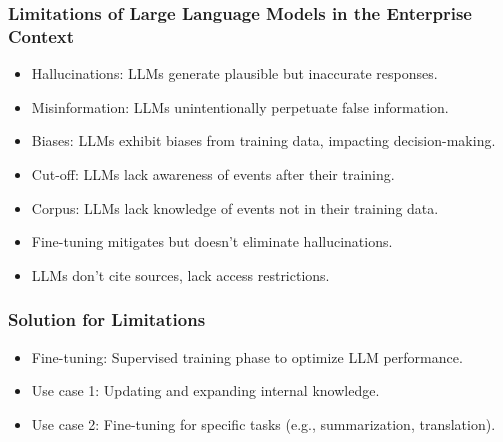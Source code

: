 


\begin{frame}[fragile]\frametitle{Limitations of Large Language Models in the Enterprise Context}

\begin{itemize}
\item Hallucinations: LLMs generate plausible but inaccurate responses.
\item Misinformation: LLMs unintentionally perpetuate false information.
\item Biases: LLMs exhibit biases from training data, impacting decision-making.
\item Cut-off: LLMs lack awareness of events after their training.
\item Corpus: LLMs lack knowledge of events not in their training data.
\item Fine-tuning mitigates but doesn't eliminate hallucinations.
\item LLMs don't cite sources, lack access restrictions.
\end{itemize}	

\end{frame}

\begin{frame}[fragile]\frametitle{Solution for Limitations}

\begin{itemize}
\item Fine-tuning: Supervised training phase to optimize LLM performance.
\item Use case 1: Updating and expanding internal knowledge.
\item Use case 2: Fine-tuning for specific tasks (e.g., summarization, translation).
\end{itemize}	

\end{frame}


